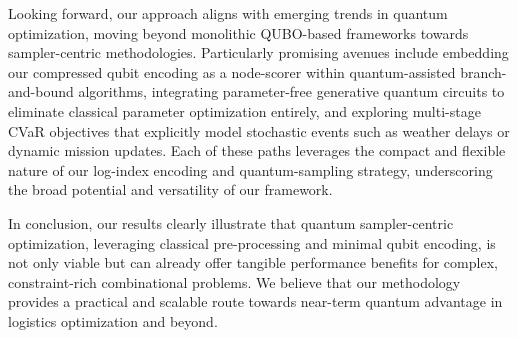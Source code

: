 Looking forward, our approach aligns with emerging trends in quantum optimization, moving beyond monolithic QUBO-based frameworks towards sampler-centric methodologies. Particularly promising avenues include embedding our compressed qubit encoding as a node-scorer within quantum-assisted branch-and-bound algorithms, integrating parameter-free generative quantum circuits to eliminate classical parameter optimization entirely, and exploring multi-stage CVaR objectives that explicitly model stochastic events such as weather delays or dynamic mission updates. Each of these paths leverages the compact and flexible nature of our log-index encoding and quantum-sampling strategy, underscoring the broad potential and versatility of our framework.

In conclusion, our results clearly illustrate that quantum sampler-centric optimization, leveraging classical pre-processing and minimal qubit encoding, is not only viable but can already offer tangible performance benefits for complex, constraint-rich combinational problems. We believe that our methodology provides a practical and scalable route towards near-term quantum advantage in logistics optimization and beyond.
